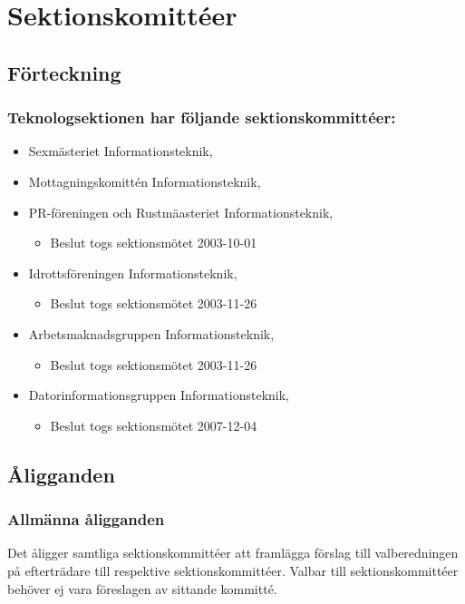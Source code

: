 \section{Sektionskomittéer}

\subsection{Förteckning}

\subsubsection{Teknologsektionen har följande sektionskommittéer:}

\begin{itemize}
	\item Sexmästeriet Informationsteknik, \SEXIT
	\item Mottagningskomittén Informationsteknik, \NOLLKIT
	\item PR-föreningen och Rustmäasteriet Informationsteknik, \PRIT
	\begin{itemize}
		\item Beslut togs sektionsmötet 2003-10-01
	\end{itemize}
	\item Idrottsföreningen Informationsteknik, \FRITID
	\begin{itemize}
		\item Beslut togs sektionsmötet 2003-11-26
	\end{itemize}
	\item Arbetsmaknadsgruppen Informationsteknik, \ARMIT
	\begin{itemize}
		\item Beslut togs sektionsmötet 2003-11-26
	\end{itemize}
	\item Datorinformationsgruppen Informationsteknik, \DIGIT
	\begin{itemize}
		\item Beslut togs sektionsmötet 2007-12-04 
	\end{itemize}

\end{itemize}

\subsection{Åligganden}
\subsubsection{Allmänna åligganden}
Det åligger samtliga sektionskommittéer att framlägga förslag till valberedningen på efterträdare till respektive sektionskommittéer. Valbar till sektionskommittéer behöver ej vara föreslagen av sittande kommitté.

\newpage

\newpage

\newpage

\newpage

\newpage

\newpage

\newpage
